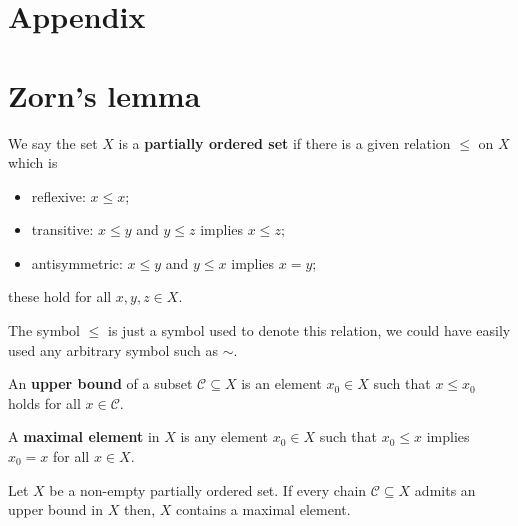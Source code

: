 \documentclass[12pt, a4paper]{article}
\begin{document}
\pagebreak

\appendix

\section*{Appendix}

\section{Zorn's lemma}

\begin{definition}
    We say the set \(X\) is a \textbf{partially ordered set} if there is a given relation \(\leq\) on \(X\) which is 
    \begin{itemize}
        \item reflexive: \(x\leq x\);
        \item transitive: \(x\leq y\) and \(y\leq z\) implies \(x\leq z\);
        \item antisymmetric: \(x \leq y\) and \(y\leq x\) implies \(x=y\);
    \end{itemize}
    these hold for all \(x,y,z\in X\).
\end{definition}

\begin{mdnote}
    The symbol \(\leq\) is just a symbol used to denote this relation, we could have easily used any arbitrary symbol such as \(\sim\).
\end{mdnote}

\begin{definition}
    An \textbf{upper bound} of a subset \(\mathcal{C}\subseteq X\) is an element \(x_0 \in X\) such that \(x\leq x_0\) holds for all \(x\in \mathcal{C}\).
\end{definition}

\begin{definition}
    A \textbf{maximal element} in \(X\) is any element \(x_0 \in X\) such that \(x_0 \leq x\) implies \(x_0=x\) for all \(x\in X\).
\end{definition}

\begin{mdthm}
    Let \(X\) be a non-empty partially ordered set. If every chain \(\mathcal{C} \subseteq X\) admits an upper bound in \(X\) then, \(X\) contains a maximal element.
\end{mdthm}
\end{document}

